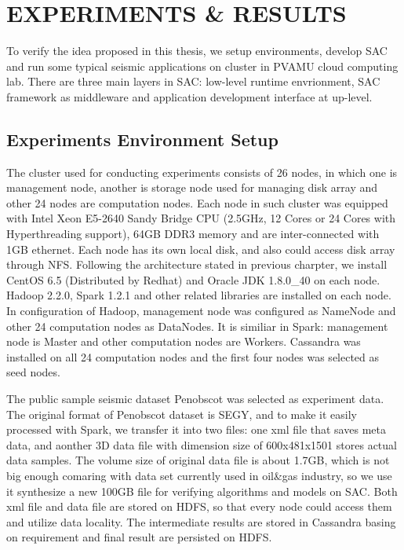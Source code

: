 %
%
%


\chapter{\uppercase{Experiments \& Results}}
To verify the idea proposed in this thesis, we setup environments, develop SAC and run some typical seismic applications on cluster in PVAMU cloud computing lab. There are three main layers in SAC: low-level runtime envrionment, SAC framework as middleware and application development interface at up-level. 

\section{Experiments Environment Setup}

The cluster used for conducting experiments consists of 26 nodes, in which one is management node, another is storage node used for managing disk array and other 24 nodes are computation nodes. Each node in such cluster was equipped with Intel Xeon E5-2640 Sandy Bridge CPU (2.5GHz, 12 Cores or 24 Cores with Hyperthreading support), 64GB DDR3 memory and are inter-connected with 1GB ethernet. Each node has its own local disk, and also could access disk array through NFS. Following the architecture stated in previous charpter, we install CentOS 6.5 (Distributed by Redhat) and Oracle JDK 1.8.0\_40 on each node. Hadoop 2.2.0, Spark 1.2.1 and other related libraries are installed on each node. In configuration of Hadoop, management node was configured as NameNode and other 24 computation nodes as DataNodes. It is similiar in Spark: management node is Master and other computation nodes are Workers. Cassandra was installed on all 24 computation nodes and the first four nodes was selected as seed nodes.


The public sample seismic dataset Penobscot \cite{PenobscotData} was selected as experiment data. The original format of Penobscot dataset is SEGY, and to make it easily processed with Spark, we transfer it into two files: one xml file that saves meta data, and aonther 3D data file with dimension size of 600x481x1501 stores actual data samples. The volume size of original data file is about 1.7GB, which is not big enough comaring with data set currently used in oil\&gas industry, so we use it synthesize a new 100GB file for verifying algorithms and models on SAC. Both xml file and data file are stored on HDFS, so that every node could access them and utilize data locality. The intermediate results are stored in Cassandra basing on requirement and final result are persisted on HDFS. 

